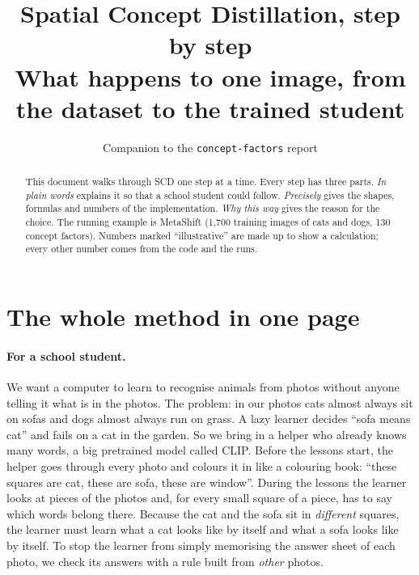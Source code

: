 \documentclass[11pt]{article}
\title{\textbf{Spatial Concept Distillation, step by step}\\[3pt]
\large What happens to one image, from the dataset to the trained student}
\author{Companion to the \texttt{concept-factors} report}
\date{}
\begin{document}
\maketitle
\vspace{-1.5em}

\begin{abstract}
\noindent This document walks through SCD one step at a time. Every step has three parts. \emph{In plain words}
explains it so that a school student could follow. \emph{Precisely} gives the shapes, formulas and numbers of
the implementation. \emph{Why this way} gives the reason for the choice. The running example is MetaShift
(1,700 training images of cats and dogs, 130 concept factors). Numbers marked ``illustrative'' are made up to
show a calculation; every other number comes from the code and the runs.
\end{abstract}

\tableofcontents
\newpage

\section{The whole method in one page}

\paragraph{For a school student.} We want a computer to learn to recognise animals from photos without anyone
telling it what is in the photos. The problem: in our photos cats almost always sit on sofas and dogs almost
always run on grass. A lazy learner decides ``sofa means cat'' and fails on a cat in the garden. So we bring in
a helper who already knows many words, a big pretrained model called CLIP. Before the lessons start, the
helper goes through every photo and colours it in like a colouring book: ``these squares are cat, these are
sofa, these are window''. During the lessons the learner looks at pieces of the photos and, for every small
square of a piece, has to say which words belong there. Because the cat and the sofa sit in \emph{different}
squares, the learner must learn what a cat looks like by itself and what a sofa looks like by itself. To stop
the learner from simply memorising the answer sheet of each photo, we check its answers with a rule built from
\emph{other} photos.
\end{document}
